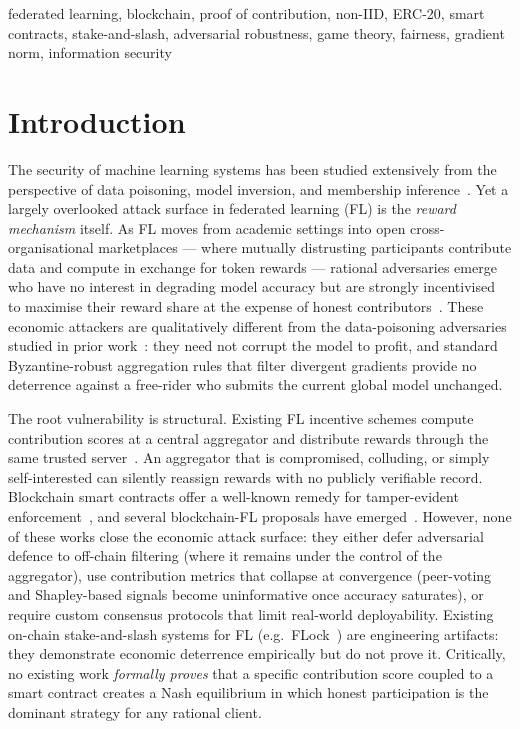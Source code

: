 \documentclass[journal]{IEEEtran}
\theoremstyle{definition}
\theoremstyle{remark}
\begin{document}
\begin{IEEEkeywords}
federated learning, blockchain, proof of contribution, non-IID,
ERC-20, smart contracts, stake-and-slash, adversarial robustness,
game theory, fairness, gradient norm, information security
\end{IEEEkeywords}

\section{Introduction}
\label{sec:intro}

The security of machine learning systems has been studied extensively
from the perspective of data poisoning, model inversion, and
membership inference~\cite{bagdasaryan2020backdoor,bhagoji2019analyzing}.
Yet a largely overlooked attack surface in federated learning (FL) is
the \emph{reward mechanism} itself.
As FL moves from academic settings into open cross-organisational
marketplaces --- where mutually distrusting participants contribute
data and compute in exchange for token rewards --- rational adversaries
emerge who have no interest in degrading model accuracy but are
strongly incentivised to maximise their reward share at the expense of
honest contributors~\cite{lin2019free, song2019profit}.
These economic attackers are qualitatively different from the
data-poisoning adversaries studied in prior
work~\cite{bhagoji2019analyzing}: they need not corrupt the model to
profit, and standard Byzantine-robust aggregation rules that filter
divergent gradients provide no deterrence against a free-rider who
submits the current global model unchanged.

The root vulnerability is structural.
Existing FL incentive schemes compute contribution scores at a central
aggregator and distribute rewards through the same trusted
server~\cite{wang2020measure, gradient_driven_fairness2021}.
An aggregator that is compromised, colluding, or simply
self-interested can silently reassign rewards with no publicly
verifiable record.
Blockchain smart contracts offer a well-known remedy for tamper-evident
enforcement~\cite{buterin2014ethereum}, and several blockchain-FL
proposals have emerged~\cite{kim2019blockchained, bladefl2022,
poshapley2023, behera2021federated}.
However, none of these works close the economic attack surface:
they either defer adversarial defence to off-chain filtering (where it
remains under the control of the aggregator), use contribution metrics
that collapse at convergence (peer-voting and Shapley-based signals
become uninformative once accuracy saturates), or require custom
consensus protocols that limit real-world deployability.
Existing on-chain stake-and-slash systems for FL (e.g.\
FLock~\cite{dong2022flock}) are engineering artifacts: they
demonstrate economic deterrence empirically but do not prove it.
Critically, no existing work \emph{formally proves} that a
specific contribution score coupled to a smart contract creates a
Nash equilibrium in which honest participation is the dominant
strategy for any rational client.
\end{document}
